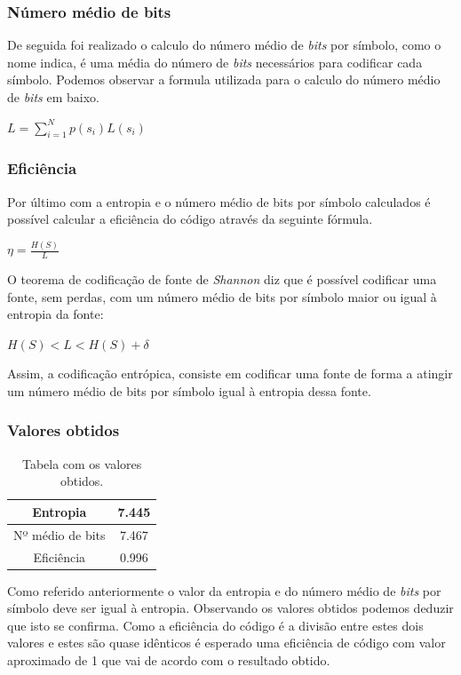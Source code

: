 \documentclass[12pt,a4paper]{article}
\begin{document}
\subsubsection{Número médio de bits}
De seguida foi realizado o calculo do número médio de \textit{bits} por símbolo, como o nome indica, é uma média do número de \textit{bits} necessários para codificar cada símbolo. Podemos observar a formula utilizada para o calculo do número médio de \textit{bits} em baixo.
\begin{center}
$L = \sum\limits_{i=1}^N p(s_i)L(s_i)$
\end{center}

\subsubsection{Eficiência}
Por último com a entropia e o número médio de bits por símbolo calculados é possível calcular a eficiência do código através da seguinte fórmula.
\begin{center}
$\eta = \frac{H(S)}{L}$
\end{center}
O teorema de codificação de fonte de \textit{Shannon} diz que é possível codificar uma fonte, sem perdas, com um número médio de bits por símbolo maior ou igual à entropia da fonte:
\begin{center}
$H(S) < L < H(S) + \delta$
\end{center}
Assim, a codificação entrópica, consiste em codificar uma fonte de forma a atingir um número médio de bits por símbolo igual à entropia dessa fonte. 

\subsubsection{Valores obtidos}
\begin{table}[h]
\centering
\label{my-label}
\begin{tabular}{|c|c|}
\hline
Entropia              & 7.445 \\ 
\hline
Nº médio de bits      & 7.467 \\ 
\hline
Eficiência            & 0.996 \\ 
\hline
\end{tabular}
\caption{Tabela com os valores obtidos.}
\end{table}

Como referido anteriormente o valor da entropia e do número médio de \textit{bits} por símbolo deve ser igual à entropia. Observando os valores obtidos podemos deduzir que isto se confirma. Como a eficiência do código é a divisão entre estes dois valores e estes são quase idênticos é esperado uma eficiência de código com valor aproximado de 1 que vai de acordo com o resultado obtido.
\end{document}
